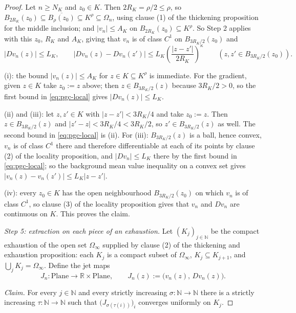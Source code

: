 \begin{proof}
Let $n\ge N_K$ and $z_0\in K$.  Then $2R_K=\rho/2\le\rho$, so
$B_{2R_K}(z_0)\subseteq\overline{B_{\rho}(z_0)}\subseteq K^{\rho}\subseteq\Omega_n$, using
clause (1) of the thickening proposition for the middle inclusion; and
$\lvert v_n\rvert\le A_K$ on $B_{2R_K}(z_0)\subseteq K^{\rho}$.  So Step 2 applies with this
$z_0$, $R_K$ and $A_K$, giving that $v_n$ is of class $C^{1}$ on $B_{3R_K/2}(z_0)$ and
\begin{equation}\label{eq:pgc-local}
  \lvert Dv_n(z)\rvert\le L_K,\qquad
  \lvert Dv_n(z)-Dv_n(z')\rvert\le L_K\left(\frac{\lvert z-z'\rvert}{2R_K}\right)^{\kappa}
  \qquad(z,z'\in B_{3R_K/2}(z_0)).
\end{equation}

(i): the bound $\lvert v_n(z)\rvert\le A_K$ for $z\in K\subseteq K^{\rho}$ is immediate.  For
the gradient, given $z\in K$ take $z_0:=z$ above; then $z\in B_{3R_K/2}(z)$ because
$3R_K/2>0$, so the first bound in \eqref{eq:pgc-local} gives $\lvert Dv_n(z)\rvert\le L_K$.

(ii) and (iii): let $z,z'\in K$ with $\lvert z-z'\rvert<3R_K/4$ and take $z_0:=z$.  Then
$z\in B_{3R_K/2}(z)$ and $\lvert z'-z\rvert<3R_K/4<3R_K/2$, so $z'\in B_{3R_K/2}(z)$ as well.
The second bound in \eqref{eq:pgc-local} is (ii).  For (iii): $B_{3R_K/2}(z)$ is a ball, hence
convex, $v_n$ is of class $C^{1}$ there and therefore differentiable at each of its points by
clause (2) of the locality proposition, and $\lvert Dv_n\rvert\le L_K$ there by the first bound
in \eqref{eq:pgc-local}; so the background mean value inequality on a convex set gives
$\lvert v_n(z)-v_n(z')\rvert\le L_K\lvert z-z'\rvert$.

(iv): every $z_0\in K$ has the open neighbourhood $B_{3R_K/2}(z_0)$ on which $v_n$ is of class
$C^{1}$, so clause (3) of the locality proposition gives that $v_n$ and $Dv_n$ are continuous
on $K$.  This proves the claim.

\medskip\noindent\emph{Step 5: extraction on each piece of an exhaustion.}
Let $(K_j)_{j\in\mathbb{N}}$ be the compact exhaustion of the open set $\Omega_\infty$ supplied
by clause (2) of the thickening and exhaustion proposition: each $K_j$ is a compact subset of
$\Omega_\infty$, $K_j\subseteq K_{j+1}$, and $\bigcup_jK_j=\Omega_\infty$.  Define the jet maps
\[
  J_n\colon\mathrm{Plane}\to\mathbb{R}\times\mathrm{Plane},\qquad
  J_n(z):=\bigl(v_n(z),\,Dv_n(z)\bigr).
\]

\emph{Claim.}  For every $j\in\mathbb{N}$ and every strictly increasing
$\sigma\colon\mathbb{N}\to\mathbb{N}$ there is a strictly increasing
$\tau\colon\mathbb{N}\to\mathbb{N}$ such that $\bigl(J_{\sigma(\tau(i))}\bigr)_{i}$ converges
uniformly on $K_j$.


\end{proof}
